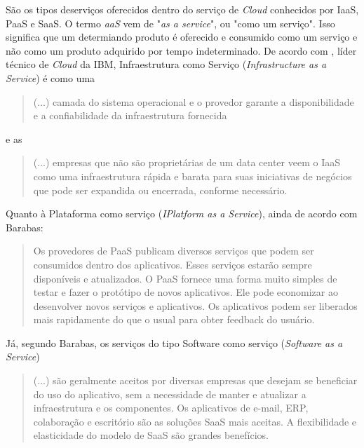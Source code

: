 \documentclass[a4paper]{article}
\begin{document}
São os tipos deserviços oferecidos dentro do serviço de \emph{Cloud} conhecidos por IaaS, PaaS e SaaS. O termo \emph{aaS} vem de "\emph{as a service}", ou "como um serviço". Isso significa que um determiando produto é oferecido e consumido como um serviço e não como um produto adquirido por tempo indeterminado. De acordo com , líder técnico de \emph{Cloud} da IBM, Infraestrutura como Serviço (\emph{Infrastructure as a Service}) é como uma 
\begin{quotation}
(...) camada do sistema operacional e o provedor garante a disponibilidade e a confiabilidade da infraestrutura fornecida
\end{quotation}
e as
\begin{quotation}
(...) empresas que não são proprietárias de um data center veem o IaaS como uma infraestrutura rápida e barata para suas iniciativas de negócios que pode ser expandida ou encerrada, conforme necessário.
\end{quotation}
Quanto à Plataforma como serviço (\emph{IPlatform as a Service}), ainda de acordo com Barabas:
\begin{quotation}
Os provedores de PaaS publicam diversos serviços que podem ser consumidos dentro dos aplicativos. Esses serviços estarão sempre disponíveis e atualizados. O PaaS fornece uma forma muito simples de testar e fazer o protótipo de novos aplicativos. Ele pode economizar ao desenvolver novos serviços e aplicativos. Os aplicativos podem ser liberados mais rapidamente do que o usual para obter feedback do usuário.
\end{quotation}
Já, segundo Barabas, os serviços do tipo Software como serviço (\emph{Software as a Service}) 
\begin{quotation}
(...) são geralmente aceitos por diversas empresas que desejam se beneficiar do uso do aplicativo, sem a necessidade de manter e atualizar a infraestrutura e os componentes. Os aplicativos de e-mail, ERP, colaboração e escritório são as soluções SaaS mais aceitas. A flexibilidade e elasticidade do modelo de SaaS são grandes benefícios.
\end{quotation}
\end{document}
